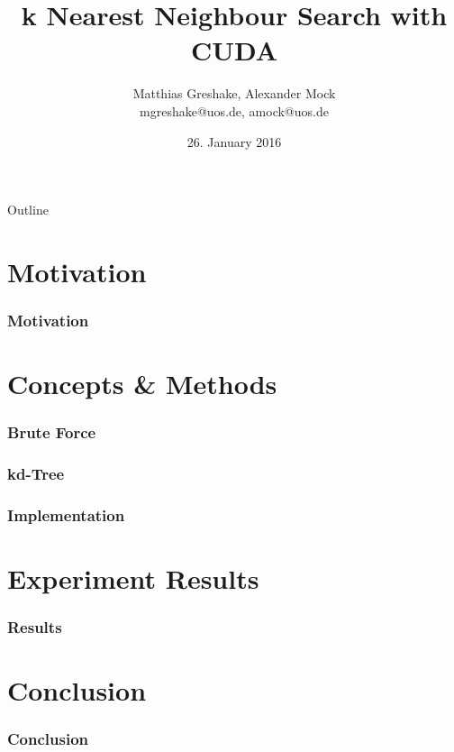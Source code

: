 \documentclass{beamer}
\begin{document}
\title{k Nearest Neighbour Search with CUDA}
\author[Matthias Greshake, Alexander Mock]{Matthias Greshake, Alexander Mock\\ {\scriptsize mgreshake@uos.de, amock@uos.de}}
\date{26. January 2016}

\begin{frame}[plain]
	\titlepage
\end{frame} 

\begin{frame}{Outline}
	\tableofcontents
\end{frame} 

\section{Motivation}

\begin{frame}
	\frametitle{Motivation}
\end{frame}

\section{Concepts \& Methods}

\begin{frame}
	\frametitle{Brute Force}
\end{frame}

\begin{frame}
	\frametitle{kd-Tree}
\end{frame}

\begin{frame}
	\frametitle{Implementation}
\end{frame}

\section{Experiment Results}

\begin{frame}
	\frametitle{Results}
\end{frame}

\section{Conclusion}

\begin{frame}
	\frametitle{Conclusion}
\end{frame}
\end{document}
